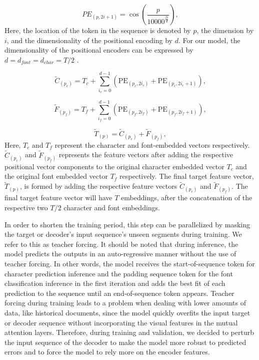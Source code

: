 \documentclass[conference]{IEEEtran}
\begin{document}
\begin{equation}\label{1D_pos_2}
{PE}_{(p, 2i + 1)} = \cos\left(\frac{{p}}{{10000}^{\frac{2i}{d}}}\right), \tag{3}
\end{equation}
Here, the location of the token in the sequence is denoted by \(p\), the dimension by  \(i\), and the dimensionality of the positional encoding by  \(d\). For our model, the dimensionality of the positional encoders can be expressed by \(d = d_{font} = d_{char} = T/2\)  .\newline

\begin{equation}\label{pos_encoding_addition_character}
\tilde{C}_{(p_c)} = T_c + \sum_{i_c=0}^{d-1} \left( \text{PE}_{(p_c, 2i_c)} + \text{PE}_{(p_c, 2i_c+1)} \right), \tag{4}
\end{equation}

\begin{equation}\label{pos_encoding_addition_font}
\tilde{F}_{(p_f)} = T_f + \sum_{i_f=0}^{d-1} \left( \text{PE}_{(p_f, 2i_f)} + \text{PE}_{(p_f, 2i_f+1)} \right), \tag{5}
\end{equation}

\begin{equation}\label{pos_encoding_addition_font_character}
\tilde{T}_{(p)} = \tilde{C}_{(p_c)} + \tilde{F}_{(p_f)} , \tag{6}
\end{equation}
Here, \(T_c\) and \(T_f\) represent the character and font-embedded vectors respectively. \(\tilde{C}_{(p_c)}\) and \(\tilde{F}_{(p_f)}\) represents the feature vectors after adding the respective positional vector components to the original character embedded vector \(T_c\) and the original font embedded vector \(T_f\) respectively. The final target feature vector, \(\tilde{T}_{(p)}\), is formed by adding the respective feature vectors \(\tilde{C}_{(p_c)}\) and \(\tilde{F}_{(p_f)}\). The final target feature vector will have \(T\) embeddings, after the concatenation of the respective two \(T/2\) character and font embeddings.

In order to shorten the training period, this step can be parallelized by masking the target or decoder's input sequence's unseen segments during training\cite{faucris.276690551}. We refer to this as teacher forcing. It should be noted that during inference, the model predicts the outputs in an auto-regressive manner without the use of teacher forcing. In other words, the model receives the start-of-sequence token for character prediction inference and the padding sequence token for the font classification inference in the first iteration and adds the best fit of each prediction to the sequence until an end-of-sequence token appears. Teacher forcing during training leads to a problem when dealing with lower amounts of data, like historical documents, since the model quickly overfits the input target or decoder sequence without incorporating the visual features in the mutual attention layers. Therefore, during training and validation, we decided to perturb the input sequence of the decoder to make the model more robust to predicted errors and to force the model to rely more on the encoder features\cite{faucris.276690551}.
\end{document}
